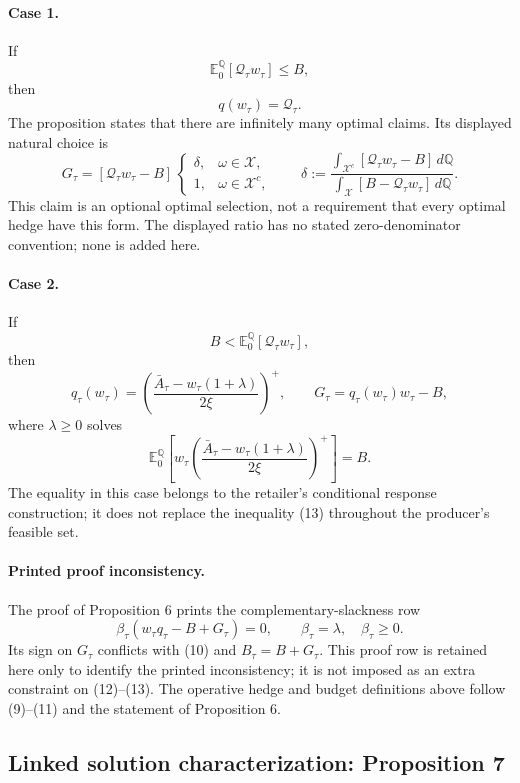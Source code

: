 \documentclass{article}
\begin{document}
\paragraph{Case 1.}
If
\[
\mathbb E_0^{\mathbb Q}[\mathscr Q_\tau w_\tau]\leqslant B,
\]
then
\[
q(w_\tau)=\mathscr Q_\tau.
\]
The proposition states that there are infinitely many optimal claims.
Its displayed natural choice is
\[
G_\tau=[\mathscr Q_\tau w_\tau-B]\,
\begin{cases}
\delta,&\omega\in\mathscr X,\\
1,&\omega\in\mathscr X^c,
\end{cases}
\qquad
\delta:=
\frac{\displaystyle\int_{\mathscr X^c}
 [\mathscr Q_\tau w_\tau-B]\,d\mathbb Q}
{\displaystyle\int_{\mathscr X}
 [B-\mathscr Q_\tau w_\tau]\,d\mathbb Q}.
\]
This claim is an optional optimal selection, not a requirement that every
optimal hedge have this form. The displayed ratio has no stated
zero-denominator convention; none is added here.

\paragraph{Case 2.}
If
\[
B<\mathbb E_0^{\mathbb Q}[\mathscr Q_\tau w_\tau],
\]
then
\[
q_\tau(w_\tau)=
\left(\frac{\bar A_\tau-w_\tau(1+\lambda)}{2\xi}\right)^+,
\qquad
G_\tau=q_\tau(w_\tau)w_\tau-B,
\]
where $\lambda\geqslant0$ solves
\[
\mathbb E_0^{\mathbb Q}\left[
 w_\tau\left(\frac{\bar A_\tau-w_\tau(1+\lambda)}{2\xi}\right)^+
\right]=B.
\]
The equality in this case belongs to the retailer's conditional response
construction; it does not replace the inequality (13) throughout the
producer's feasible set.

\paragraph{Printed proof inconsistency.}
The proof of Proposition 6 prints the complementary-slackness row
\[
\beta_\tau(w_\tau q_\tau-B+G_\tau)=0,
\qquad \beta_\tau=\lambda,\quad \beta_\tau\geqslant0.
\]
Its sign on $G_\tau$ conflicts with (10) and
$B_\tau=B+G_\tau$. This proof row is retained here only to identify the
printed inconsistency; it is not imposed as an extra constraint on
(12)--(13). The operative hedge and budget definitions above follow
(9)--(11) and the statement of Proposition 6.

\subsection*{Linked solution characterization: Proposition 7}
\end{document}
